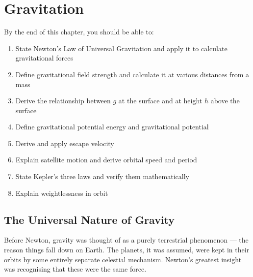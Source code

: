 %

\chapter{Gravitation}
\label{ch:gravitation}


\begin{objectivebox}
By the end of this chapter, you should be able to:
\begin{enumerate}[noitemsep]
  \item State Newton's Law of Universal Gravitation
  and apply it to calculate gravitational forces
  \item Define gravitational field strength and
  calculate it at various distances from a mass
  \item Derive the relationship between $g$ at the
  surface and at height $h$ above the surface
  \item Define gravitational potential energy and
  gravitational potential
  \item Derive and apply escape velocity
  \item Explain satellite motion and derive orbital
  speed and period
  \item State Kepler's three laws and verify them
  mathematically
  \item Explain weightlessness in orbit
\end{enumerate}
\end{objectivebox}

\vspace{0.5cm}

\section{The Universal Nature of Gravity}

Before Newton, gravity was thought of as a purely
terrestrial phenomenon --- the reason things fall
down on Earth. The planets, it was assumed, were kept
in their orbits by some entirely separate celestial
mechanism. Newton's greatest insight was recognising
that these were the same force.

